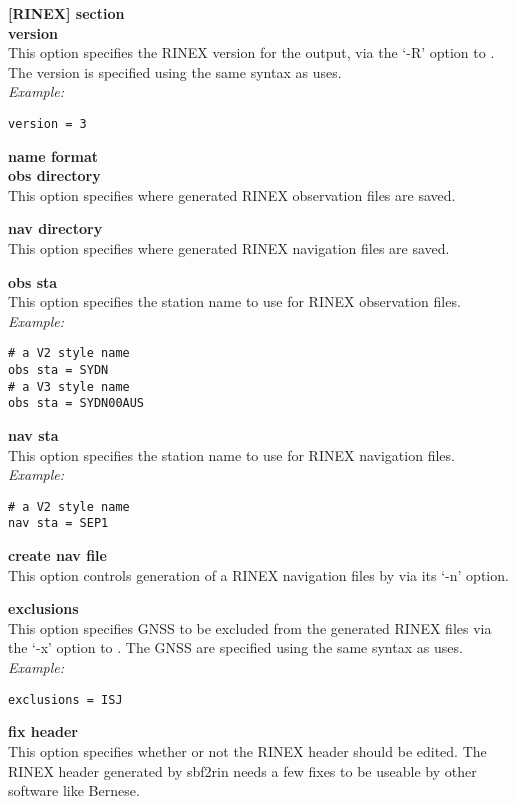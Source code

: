 {\bfseries [RINEX] section}\\

{\bfseries version}\\
This option specifies the RINEX version for the output, via the `-R' option to .
The version is specified using the same syntax as  uses.\\
\textit{Example:}
\begin{lstlisting}
version = 3 
\end{lstlisting}

{\bfseries name format}\\

{\bfseries obs directory}\\
This option specifies where generated RINEX observation files  are saved.

{\bfseries nav directory}\\
This option specifies where generated RINEX navigation files  are saved.

{\bfseries obs sta}\\
This option specifies the station name to use for RINEX observation files.
\textit{Example:}
\begin{lstlisting}
# a V2 style name
obs sta = SYDN
# a V3 style name
obs sta = SYDN00AUS
\end{lstlisting}

{\bfseries nav sta}\\
This option specifies the station name to use for RINEX navigation files.
\textit{Example:}
\begin{lstlisting}
# a V2 style name
nav sta = SEP1
\end{lstlisting}

{\bfseries create nav file}\\
This option controls generation of a RINEX navigation files by  via its `-n' option.

{\bfseries exclusions}\\
This option specifies GNSS to be excluded from the generated RINEX files via the `-x' option to .
The GNSS are specified using the same syntax as  uses.\\
\textit{Example:}
\begin{lstlisting}
exclusions = ISJ 
\end{lstlisting}

{\bfseries fix header}\\
This option specifies whether or not the RINEX header should be edited. 
The RINEX header generated by sbf2rin needs a few fixes to be useable by other software like Bernese. 

